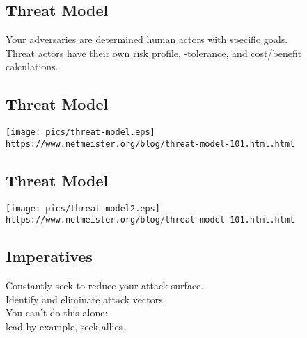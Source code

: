 \documentclass[xga]{xdvislides}
\begin{document}
\subsection{Threat Model}
\vspace*{\fill}
\Huge
\begin{center}
Your adversaries are determined human actors with
specific goals. \\
\addvspace{.5in}
Threat actors have their own risk profile, -tolerance, and cost/benefit calculations.
\end{center}
\Normalsize
\vspace*{\fill}

\subsection{Threat Model}
\vspace*{\fill}
\begin{center}
	\texttt{[image: pics/threat-model.eps]} \\
\vspace{.2in}
\small
	\verb+https://www.netmeister.org/blog/threat-model-101.html.html+
\end{center}
\Normalsize
\vspace*{\fill}

\subsection{Threat Model}
\vspace*{\fill}
\begin{center}
	\texttt{[image: pics/threat-model2.eps]} \\
\vspace{.2in}
\small
	\verb+https://www.netmeister.org/blog/threat-model-101.html.html+
\end{center}
\Normalsize
\vspace*{\fill}



\subsection{Imperatives}
\vspace*{\fill}
\Huge
\begin{center}
Constantly seek to reduce your attack surface. \\
Identify and eliminate attack vectors.\\

\addvspace{.5in}
You can't do this alone:\\
lead by example, seek allies.
\end{center}
\Normalsize
\vspace*{\fill}
\end{document}
